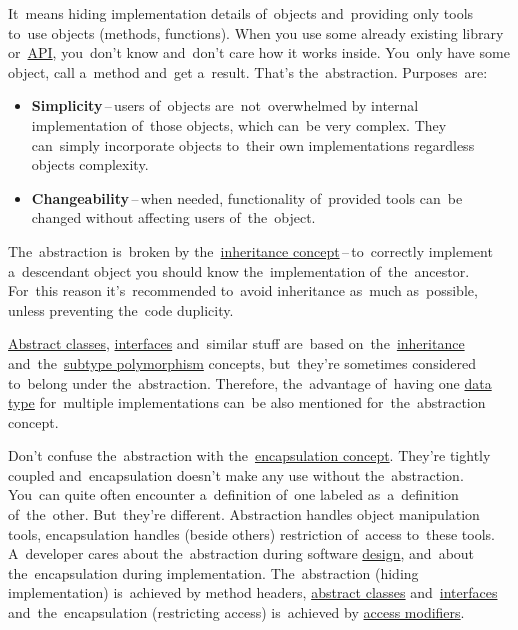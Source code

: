 \label{abstraction}
It~means hiding implementation details of~objects and~providing only tools to~use objects (methods, functions). When you use some already existing library or~\hyperref[api]{API}, you~don't know and~don't care how it works inside. You~only have some object, call a~method and~get a~result. That's the~abstraction. Purposes~are:
\begin{itemize}
    \item \textbf{Simplicity}\,--\,users of~objects are~not~overwhelmed by internal implementation of~those objects, which can~be very complex. They can~simply incorporate objects to~their own implementations regardless objects complexity.
    \item \textbf{Changeability}\,--\,when needed, functionality of~provided tools can~be changed without affecting users of~the~object.
\end{itemize}

\warning The~abstraction is~broken by the~\hyperref[inheritance]{inheritance concept}\,--\,to~correctly implement a~descendant object you should know the~implementation of~the~ancestor. For~this reason it's~recommended to~avoid inheritance as~much as~possible, unless preventing the~code duplicity.

\warning \hyperref[javaabstractclasses]{Abstract classes}, \hyperref[javainterfaces]{interfaces} and~similar stuff are~based on~the~\hyperref[inheritance]{inheritance} and~the~\hyperref[polymorphism]{subtype polymorphism} concepts, but~they're sometimes considered to~belong under the~abstraction. Therefore, the~advantage of~having one \hyperref[datatypes]{data type} for~multiple implementations can~be also mentioned for~the~abstraction concept.

\warning Don't confuse the~abstraction with the~\hyperref[encapsulation]{encapsulation concept}. They're tightly coupled and~encapsulation doesn't make any use without the~abstraction. You~can quite often encounter a~definition of~one labeled as~a~definition of~the~other. But~they're different. Abstraction handles object manipulation tools, encapsulation handles (beside others) restriction of~access to~these tools. A~developer cares about the~abstraction during software \hyperref[architecturedesign]{design}, and~about the~encapsulation during implementation. The~abstraction (hiding implementation) is~achieved by method headers, \hyperref[javaabstractclasses]{abstract classes} and~\hyperref[javainterfaces]{interfaces} and~the~encapsulation (restricting access) is~achieved by \hyperref[javaaccessmodifiers]{access modifiers}.

